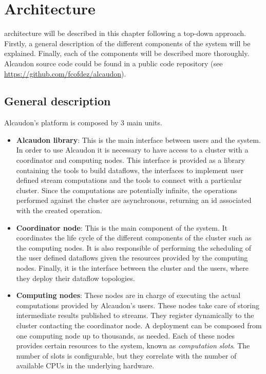 \chapter{Architecture}
\label{chapter:architecture}

 architecture will be described in this chapter following a top-down
approach. Firstly, a general description of the different components of the system
will be explained. Finally, each of the components will be described more thoroughly.
Alcaudon source code could be found in a public code repository (see
\url{https://github.com/fcofdez/alcaudon}).

\section{General description}

Alcaudon's platform is composed by 3 main units.

\begin{itemize}
\item \textbf{Alcaudon library}: This is the main interface between users
  and the system. In order to use Alcaudon it is necessary to have access to a
  cluster with a coordinator and computing nodes. This interface is provided as
  a library containing the tools to build dataflows, the interfaces to implement
  user defined stream computations and the tools to connect with a particular
  cluster. Since the computations are potentially infinite, the operations
  performed against the cluster are asynchronous, returning an id associated
  with the created operation.
\item \textbf{Coordinator node}: This is the main component of the system. It
  coordinates the life cycle of the different components of the cluster such as
  the computing nodes. It is also responsible of performing the scheduling of
  the user defined dataflows given the resources provided by the computing
  nodes. Finally, it is the interface between the cluster and the users, where
  they deploy their dataflow topologies.

\item \textbf{Computing nodes}: These nodes are in charge of executing the
  actual computations provided by Alcaudon's users. These nodes take care of
  storing intermediate results published to streams. They register dynamically
  to the cluster contacting the coordinator node. A deployment can be composed
  from one computing node up to thousands, as needed. Each of these nodes
  provides certain resources to the system, known as \textit{computation slots}.
  The number of slots is configurable, but they correlate with the number of
  available CPUs in the underlying hardware.
\end{itemize}

